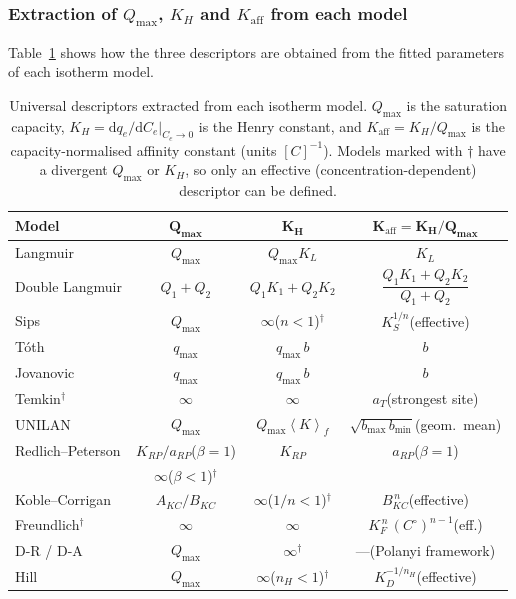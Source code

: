 \documentclass[12pt]{article}
\begin{document}
	\subsubsection{Extraction of $Q_{\max}$, $K_H$ and $K_{\mathrm{aff}}$ from each model}

	Table~\ref{tab:universal_descriptors} shows how the three
	descriptors are obtained from the fitted parameters of each
	isotherm model.

	\begin{table}[htbp]
		\centering
		\small
		\caption{Universal descriptors extracted from each isotherm
			model.  $Q_{\max}$ is the saturation capacity,
			$K_H = \mathrm{d}q_e/\mathrm{d}C_e|_{C_e\to 0}$ is the
			Henry constant, and
			$K_{\mathrm{aff}} = K_H / Q_{\max}$ is the
			capacity-normalised affinity constant (units $[C]^{-1}$).
			Models marked with $\dagger$ have a divergent $Q_{\max}$
			or $K_H$, so only an effective (concentration-dependent)
			descriptor can be defined.}
		\label{tab:universal_descriptors}
		\renewcommand{\arraystretch}{1.4}
		\begin{tabular}{lccc}
			\hline
			\textbf{Model}
			& $\boldsymbol{Q_{\max}}$
			& $\boldsymbol{K_H}$
			& $\boldsymbol{K_{\mathrm{aff}} = K_H/Q_{\max}}$
			\\
			\hline
			Langmuir
			& $Q_{\max}$
			& $Q_{\max} K_L$
			& $K_L$
			\\
			Double Langmuir
			& $Q_1 + Q_2$
			& $Q_1 K_1 + Q_2 K_2$
			& $\dfrac{Q_1 K_1 + Q_2 K_2}{Q_1 + Q_2}$
			\\[4pt]
			Sips
			& $Q_{\max}$
			& $\infty$\;($n<1$)$^{\dagger}$
			& $K_S^{1/n}$\;(effective)
			\\
			T\'oth
			& $q_{\max}$
			& $q_{\max}\,b$
			& $b$
			\\
			Jovanovic
			& $q_{\max}$
			& $q_{\max}\,b$
			& $b$
			\\
			Temkin$^{\dagger}$
			& $\infty$
			& $\infty$
			& $a_T$\;(strongest site)
			\\
			UNILAN
			& $Q_{\max}$
			& $Q_{\max}\!\left\langle K \right\rangle_{\!f}$
			& $\sqrt{b_{\max}\,b_{\min}}$\;(geom.\ mean)
			\\
			Redlich--Peterson
			& $K_{RP}/a_{RP}$\;($\beta\!=\!1$)
			& $K_{RP}$
			& $a_{RP}$\;($\beta\!=\!1$)
			\\
			& $\infty$\;($\beta\!<\!1$)$^{\dagger}$
			&
			&
			\\
			Koble--Corrigan
			& $A_{KC}/B_{KC}$
			& $\infty$\;($1/n<1$)$^{\dagger}$
			& $B_{KC}^{\,n}$\;(effective)
			\\
			Freundlich$^{\dagger}$
			& $\infty$
			& $\infty$
			& $K_F^{\,n}\,(C^\circ)^{n-1}$\;(eff.)
			\\
			D-R / D-A
			& $Q_{\max}$
			& $\infty^{\dagger}$
			& ---\;(Polanyi framework)
			\\
			Hill
			& $Q_{\max}$
			& $\infty$\;($n_H\!<\!1$)$^{\dagger}$
			& $K_D^{-1/n_H}$\;(effective)
			\\
			\hline
		\end{tabular}
	\end{table}
\end{document}
